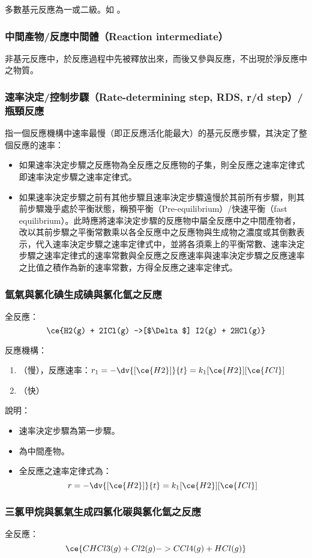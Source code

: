 \documentclass[a4paper,12pt]{report}
\begin{document}
多數基元反應為一或二級。如 。
\subsubsection{中間產物/反應中間體（Reaction intermediate）}
非基元反應中，於反應過程中先被釋放出來，而後又參與反應，不出現於淨反應中之物質。
\subsubsection{速率決定/控制步驟（Rate-determining step, RDS, r/d step）/瓶頸反應}
指一個反應機構中速率最慢（即正反應活化能最大）的基元反應步驟，其決定了整個反應的速率：
\begin{itemize}
\item 如果速率決定步驟之反應物為全反應之反應物的子集，則全反應之速率定律式即速率決定步驟之速率定律式。
\item 如果速率決定步驟之前有其他步驟且速率決定步驟遠慢於其前所有步驟，則其前步驟幾乎處於平衡狀態，稱預平衡（Pre-equilibrium）/快速平衡（fast equilibrium）。此時應將速率決定步驟的反應物中屬全反應中之中間產物者，改以其前步驟之平衡常數乘以各全反應中之反應物與生成物之濃度或其倒數表示，代入速率決定步驟之速率定律式中，並將各須乘上的平衡常數、速率決定步驟之速率定律式的速率常數與全反應之反應速率與速率決定步驟之反應速率之比值之積作為新的速率常數，方得全反應之速率定律式。
\end{itemize}
\subsubsection{氫氣與氯化碘生成碘與氯化氫之反應}
全反應：
\[\ce{H2(g) + 2ICl(g) ->[$\Delta$] I2(g) + 2HCl(g)}\]

反應機構：
\begin{enumerate}
\item {}（慢），反應速率：$r_1=-\dv{[\ce{H2}]}{t}=k_1[\ce{H2}][\ce{ICl}]$
\item {}（快）
\end{enumerate}

說明：
\begin{itemize}
\item 速率決定步驟為第一步驟。
\item {}為中間產物。
\item 全反應之速率定律式為：
\[r=-\dv{[\ce{H2}]}{t}=k_1[\ce{H2}][\ce{ICl}]\]
\end{itemize}
\subsubsection{三氯甲烷與氯氣生成四氯化碳與氯化氫之反應}
全反應：
\[\ce{CHCl3(g) + Cl2(g) -> CCl4(g) + HCl(g)}\]
\end{document}
